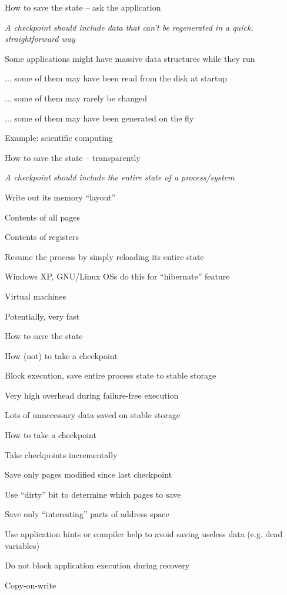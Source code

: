 \begin{frame}{How to save the state -- ask the application}
	
\BIL
\item \emph{A checkpoint should include data that can't be regenerated
in a quick, straightforward way}
\item Some applications might have massive data structures while they run
\BI
\item ... some of them may have been read from the disk at startup
\item ... some of them may rarely be changed
\item ... some of them may have been generated on the fly
\EI
\item Example: scientific computing
\EIL
\end{frame}

\begin{frame}{How to save the state -- transparently}
\BIL
	\item  \emph{A checkpoint should include the entire state of a process/system}
		\BI
		\item Write out its memory “layout”
		\item Contents of all pages
		\item Contents of registers
		\EI
	\item Resume the process by simply reloading its entire state
		\BI
		\item Windows XP, GNU/Linux OSs do this for “hibernate” feature
		\item Virtual machines
		\EI
	\item Potentially, very fast
\EIL
\end{frame}

\begin{frame}{How to save the state}
\BIL
	\item How (not) to take a checkpoint
		\BI
		\item Block execution, save entire process state to stable storage
		\item Very high overhead during failure-free execution
		\item Lots of unnecessary data saved on stable storage
		\EI
	\item How to take a checkpoint
	\BI
		\item Take checkpoints incrementally
			\BI
			\item Save only pages modified since last checkpoint
			\item Use “dirty” bit to determine which pages to save
			\EI
		\item Save only “interesting” parts of address space
			\BI
			\item Use application hints or compiler help to avoid saving useless data (e.g. dead variables)
			\EI
		\item Do not block application execution during recovery
			\BI
			\item Copy-on-write	
			\EI
	\EI
\EIL	
\end{frame}

